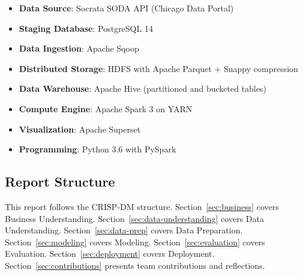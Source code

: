 \begin{itemize}
    \item \textbf{Data Source}: Socrata SODA API (Chicago Data Portal)
    \item \textbf{Staging Database}: PostgreSQL 14
    \item \textbf{Data Ingestion}: Apache Sqoop
    \item \textbf{Distributed Storage}: HDFS with Apache Parquet + Snappy compression
    \item \textbf{Data Warehouse}: Apache Hive (partitioned and bucketed tables)
    \item \textbf{Compute Engine}: Apache Spark 3 on YARN
    \item \textbf{Visualization}: Apache Superset
    \item \textbf{Programming}: Python 3.6 with PySpark
\end{itemize}

\subsection{Report Structure}

This report follows the CRISP-DM structure. Section~\ref{sec:business} covers Business Understanding. Section~\ref{sec:data-understanding} covers Data Understanding. Section~\ref{sec:data-prep} covers Data Preparation. Section~\ref{sec:modeling} covers Modeling. Section~\ref{sec:evaluation} covers Evaluation. Section~\ref{sec:deployment} covers Deployment. Section~\ref{sec:contributions} presents team contributions and reflections.

